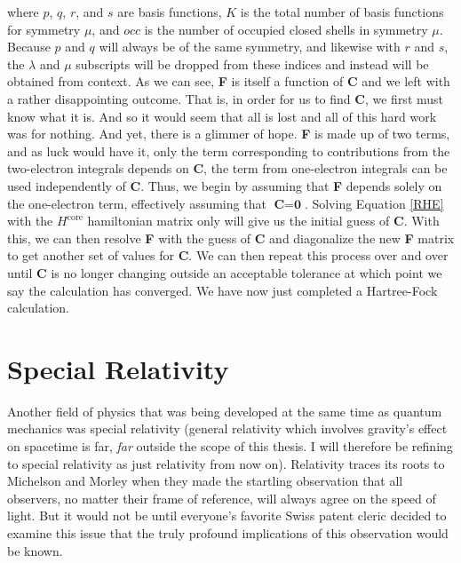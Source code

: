 \documentclass[12pt]{report}
\begin{document}
where $p$, $q$, $r$, and $s$ are basis functions, $K$ is the total number of basis functions for symmetry $\mu$, and $occ$ is the number of occupied closed shells in symmetry $\mu$. Because $p$ and $q$ will always be of the same symmetry, and likewise with $r$ and $s$, the $\lambda$ and $\mu$ subscripts will be dropped from these indices and instead will be obtained from context. As we can see, \textbf{F} is itself a function of \textbf{C} and we left with a rather disappointing outcome. That is, in order for us to find \textbf{C}, we first must know what it is. And so it would seem that all is lost and all of this hard work was for nothing. And yet, there is a glimmer of hope. \textbf{F} is made up of two terms, and as luck would have it, only the term corresponding to contributions from the two-electron integrals depends on \textbf{C}, the term from one-electron integrals can be used independently of \textbf{C}. Thus, we begin by assuming that \textbf{F} depends solely on the one-electron term, effectively assuming that $\textbf{C}=\textbf{0}$. Solving Equation \ref{RHE} with the $H^{\text{core}}$ hamiltonian matrix only will give us the initial guess of \textbf{C}. With this, we can then resolve \textbf{F} with the guess of \textbf{C} and diagonalize the new \textbf{F} matrix to get another set of values for \textbf{C}. We can then repeat this process over and over until \textbf{C} is no longer changing outside an acceptable tolerance at which point we say the calculation has converged. We have now just completed a Hartree-Fock calculation.

\section{Special Relativity}
Another field of physics that was being developed at the same time as quantum mechanics was special relativity (general relativity which involves gravity's effect on spacetime is far, \textit{far} outside the scope of this thesis. I will therefore be refining to special relativity as just relativity from now on). Relativity traces its roots to Michelson and Morley\cite{Michelson} when they made the startling observation that all observers, no matter their frame of reference, will always agree on the speed of light. But it would not be until everyone's favorite Swiss patent cleric decided to examine this issue that the truly profound implications of this observation would be known. 
\end{document}
